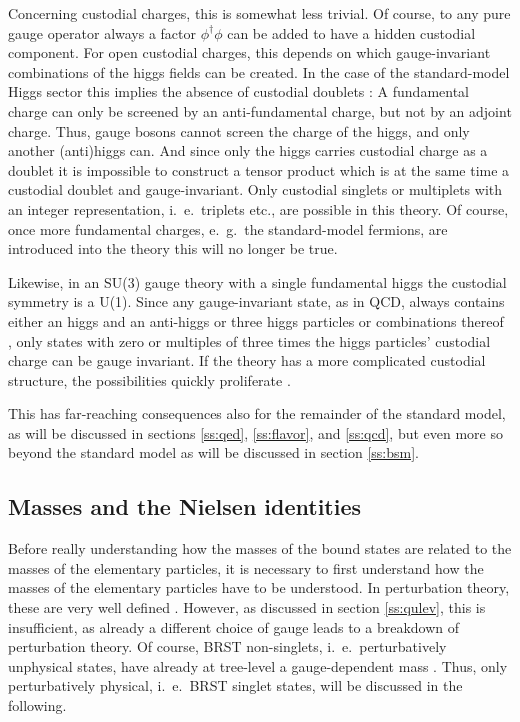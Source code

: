 \documentclass[final,twoside,12pt]{article}
\newcommand*{\1}{1\!\!\!\bot}
\begin{document}
Concerning custodial charges, this is somewhat less trivial. Of course, to any pure gauge operator always a factor $\phi^\dagger\phi$ can be added to have a hidden custodial component. For open custodial charges, this depends on which gauge-invariant combinations of the higgs fields can be created. In the case of the standard-model Higgs sector this implies the absence of custodial doublets \cite{Wurtz:2013ova,Maas:2014pba}: A fundamental charge can only be screened by an anti-fundamental charge, but not by an adjoint charge. Thus, gauge bosons cannot screen the charge of the higgs, and only another (anti)higgs can. And since only the higgs carries custodial charge as a doublet it is impossible to construct a tensor product which is at the same time a custodial doublet and gauge-invariant. Only custodial singlets or multiplets with an integer representation, i.\ e.\ triplets etc., are possible in this theory. Of course, once more fundamental charges, e.\ g.\ the standard-model fermions, are introduced into the theory this will no longer be true.

Likewise, in an SU(3) gauge theory with a single fundamental higgs the custodial symmetry is a U(1). Since any gauge-invariant state, as in QCD, always contains either an higgs and an anti-higgs or three higgs particles or combinations thereof \cite{Iida:2007qp,Maas:2016ngo,Maas:2017xzh}, only states with zero or multiples of three times the higgs particles' custodial charge can be gauge invariant. If the theory has a more complicated custodial structure, the possibilities quickly proliferate \cite{Wurtz:2009gf,Lewis:2010ps,Maas:2016qpu,Maas:2017xzh}.

This has far-reaching consequences also for the remainder of the standard model, as will be discussed in sections \ref{ss:qed}, \ref{ss:flavor}, and \ref{ss:qcd}, but even more so beyond the standard model as will be discussed in section \ref{ss:bsm}.

\subsection{Masses and the Nielsen identities}\label{ss:masses}

Before really understanding how the masses of the bound states are related to the masses of the elementary particles, it is necessary to first understand how the masses of the elementary particles have to be understood. In perturbation theory, these are very well defined \cite{Bohm:2001yx}. However, as discussed in section \ref{ss:qulev}, this is insufficient, as already a different choice of gauge leads to a breakdown of perturbation theory. Of course, BRST non-singlets, i.\ e.\ perturbatively unphysical states, have already at tree-level a gauge-dependent mass \cite{Bohm:2001yx}. Thus, only perturbatively physical, i.\ e.\ BRST singlet states, will be discussed in the following.
\end{document}
